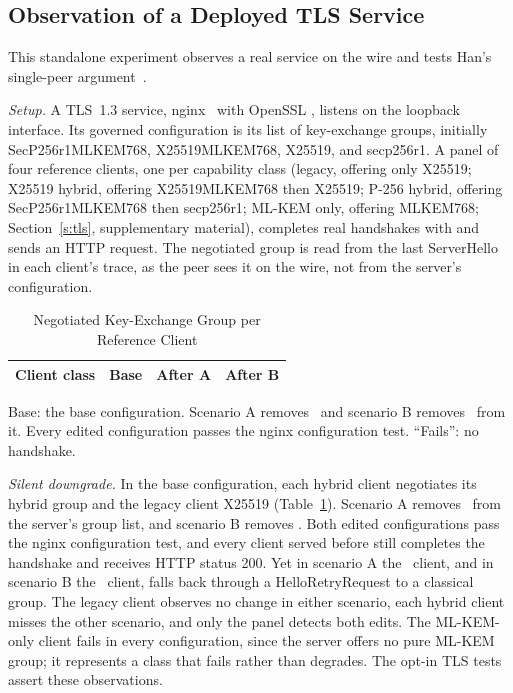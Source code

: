 \subsection{Observation of a Deployed TLS Service}
\label{sec:tls}
This standalone experiment observes a real service on the wire and tests Han's single-peer argument~\cite{han}.

\emph{Setup.} A TLS~1.3 service, nginx \TlsNginx\ with OpenSSL \TlsOpenssl, listens on the loopback interface. Its governed configuration is its list of key-exchange groups, initially SecP256r1MLKEM768, X25519MLKEM768, X25519, and secp256r1. A panel of four reference clients, one per capability class (legacy, offering only X25519; X25519 hybrid, offering X25519MLKEM768 then X25519; P-256 hybrid, offering SecP256r1MLKEM768 then secp256r1; ML-KEM only, offering MLKEM768; Section~\ref{s:tls}, supplementary material), completes real handshakes with  and sends an HTTP request. The negotiated group is read from the last ServerHello in each client's trace, as the peer sees it on the wire, not from the server's configuration.

\begin{table}[!t]
\caption{Negotiated Key-Exchange Group per Reference Client}
\label{tab:tls}
\centering
\scriptsize
\setlength{\tabcolsep}{2pt}
\begin{tabular}{@{}llll@{}}
\toprule
Client class & Base & After A & After B \\
\midrule

\end{tabular}
\par\smallskip\parbox{\linewidth}{\footnotesize Base: the base configuration. Scenario A removes \TlsRemovedA\ and scenario B removes \TlsRemovedB\ from it. Every edited configuration passes the nginx configuration test. ``Fails'': no handshake.}
\end{table}

\emph{Silent downgrade.} In the base configuration, each hybrid client negotiates its hybrid group and the legacy client X25519 (Table~\ref{tab:tls}). Scenario A removes \TlsRemovedA\ from the server's group list, and scenario B removes \TlsRemovedB. Both edited configurations pass the nginx configuration test, and every client served before still completes the handshake and receives HTTP status 200. Yet in scenario A the \TlsHitA\ client, and in scenario B the \TlsHitB\ client, falls back through a HelloRetryRequest to a classical group. The legacy client observes no change in either scenario, each hybrid client misses the other scenario, and only the panel detects both edits. The ML-KEM-only client fails in every configuration, since the server offers no pure ML-KEM group; it represents a class that fails rather than degrades. The opt-in TLS tests assert these observations.

